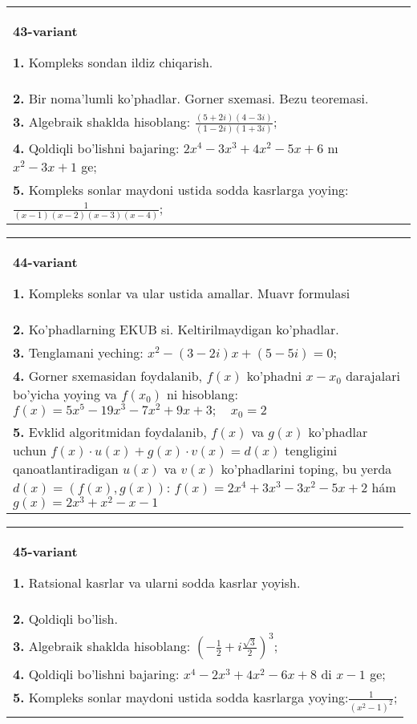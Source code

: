 \documentclass{article}
\begin{document}
\begin{tabular}{m{17cm}}
\textbf{43-variant}
\newline

\textbf{1.} Kompleks sondan ildiz chiqarish. \\
\textbf{2.} Bir noma’lumli ko’phadlar. Gorner sxemasi. Bezu teoremasi.  \\
\textbf{3.} Algebraik shaklda hisoblang: $\frac{(5+2 i)(4-3 i)}{(1-2 i)(1+3 i)}$; \\
\textbf{4.} Qoldiqli bo’lishni bajaring: $2 x^4-3 x^3+4 x^2-5 x+6$ nı $x^2-3 x+1$ ge; \\
\textbf{5.} Kompleks sonlar maydoni ustida sodda kasrlarga yoying:$\frac{1}{(x-1)(x-2)(x-3)(x-4)}$; \\

\end{tabular}
\vspace{1cm}


\begin{tabular}{m{17cm}}
\textbf{44-variant}
\newline

\textbf{1.} Kompleks sonlar va ular ustida amallar. Muavr formulasi  \\
\textbf{2.} Ko’phadlarning EKUB si. Keltirilmaydigan ko’phadlar. \\
\textbf{3.} Tenglamani yeching:  $x^2-(3-2 i) x+(5-5 i)=0$; \\
\textbf{4.} Gorner sxemasidan foydalanib, $f(x)$ ko’phadni $x-x_0$ darajalari bo’yicha yoying va $f\left(x_0\right)$ ni hisoblang: $f(x)=5 x^5-19 x^3-7 x^2+9 x+3 ; \quad x_0=2$ \\
\textbf{5.} Evklid algoritmidan foydalanib, $f(x)$ va $g(x)$ ko’phadlar uchun $f(x) \cdot u(x)+g(x) \cdot v(x)=d(x)$ tengligini qanoatlantiradigan $u(x)$ va $v(x)$ ko’phadlarini toping, bu yerda $d(x)=(f(x), g(x))$:  $f(x)=2 x^4+3 x^3-3 x^2-5 x+2$ hám $g(x)=2 x^3+x^2-x-1$ \\

\end{tabular}
\vspace{1cm}


\begin{tabular}{m{17cm}}
\textbf{45-variant}
\newline

\textbf{1.} Ratsional kasrlar va ularni sodda kasrlar yoyish. \\
\textbf{2.} Qoldiqli bo’lish.  \\
\textbf{3.} Algebraik shaklda hisoblang:  $\left(-\frac{1}{2}+i \frac{\sqrt{3}}{2}\right)^3$; \\
\textbf{4.} Qoldiqli bo’lishni bajaring: $x^4-2 x^3+4 x^2-6 x+8$ di $x-1$ ge; \\
\textbf{5.} Kompleks sonlar maydoni ustida sodda kasrlarga yoying:$\frac{1}{\left(x^2-1\right)^2}$; \\

\end{tabular}
\vspace{1cm}
\end{document}
